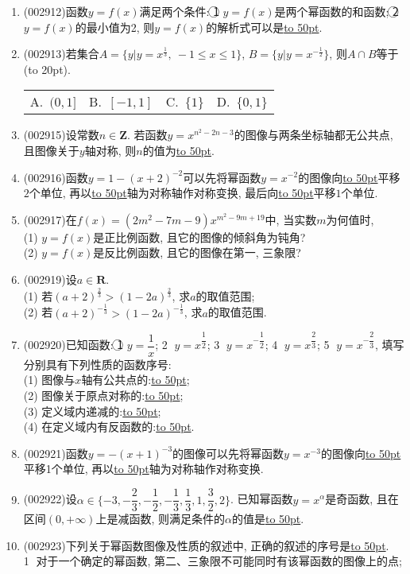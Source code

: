 \documentclass[10pt,a4paper]{article}
\newcommand{\blank}[1]{\underline{\hbox to #1pt{}}}
\newcommand{\bracket}[1]{(\hbox to #1pt{})}
\newcommand{\fourch}[4]{\par\begin{tabular}{p{.23\textwidth}p{.23\textwidth}p{.23\textwidth}p{.23\textwidth}}
A.~#1 &B.~#2& C.~#3& D.~#4
\end{tabular}}
\begin{document}
\begin{enumerate}[1.]
\item {\tiny (002912)}函数$y=f(x)$满足两个条件:
\textcircled{1} $y=f(x)$是两个幂函数的和函数; \textcircled{2} $y=f(x)$的最小值为2, 则$y=f(x)$的解析式可以是\blank{50}.
\item {\tiny (002913)}若集合$A=\{y|y={x^{\frac 13}}, \ -1\le x\le 1\}$, $B=\{y|y={x^{-\frac 12}}\}$, 则$A\cap B$等于\bracket{20}.
\fourch{$(0,1]$}{$[-1,1]$}{$\{1\}$}{$\{0,1\}$}
\item {\tiny (002915)}设常数$n\in \mathbf{Z}$. 若函数$y=x^{n^2-2n-3}$的图像与两条坐标轴都无公共点, 且图像关于$y$轴对称, 则$n$的值为\blank{50}.
\item {\tiny (002916)}函数$y=1-(x+2)^{-2}$可以先将幂函数$y=x^{-2}$的图像向\blank{50}平移$2$个单位, 再以\blank{50}轴为对称轴作对称变换, 最后向\blank{50}平移$1$个单位.
\item {\tiny (002917)}在$f(x)=(2m^2-7m-9)x^{m^2-9m+19}$中, 当实数$m$为何值时,\\
(1) $y=f(x)$是正比例函数, 且它的图像的倾斜角为钝角?\\
(2) $y=f(x)$是反比例函数, 且它的图像在第一, 三象限?
\item {\tiny (002919)}设$a\in \mathbf{R}$.\\
(1) 若$(a+2)^{\frac 23}>{(1-2a)}^{\frac 23}$, 求$a$的取值范围;\\
(2) 若$(a+2)^{-\frac 13}>(1-2a)^{-\frac 13}$, 求$a$的取值范围.
\item {\tiny (002920)}已知函数: \textcircled{1} $y=\dfrac 1x$; \textcircled{2} $y=x^{\dfrac 12}$; \textcircled{3} $y=x^{-\dfrac 12}$; \textcircled{4} $y={x^{\dfrac 23}}$; \textcircled{5} $y=x^{-\dfrac 23}$, 填写分别具有下列性质的函数序号:\\ 
(1) 图像与$x$轴有公共点的:\blank{50};\\
(2) 图像关于原点对称的:\blank{50};\\
(3) 定义域内递减的:\blank{50};\\
(4) 在定义域内有反函数的:\blank{50}.
\item {\tiny (002921)}函数$y=-(x+1)^{-3}$的图像可以先将幂函数$y=x^{-3}$的图像向\blank{50}平移1个单位, 再以\blank{50}轴为对称轴作对称变换.
\item {\tiny (002922)}设$\alpha \in \{-3,-\dfrac 23,-\dfrac 12,-\dfrac 13,\dfrac 13,1,\dfrac 32,2\}$. 已知幂函数$y=x^{\alpha}$是奇函数, 且在区间$(0,+\infty)$上是减函数, 则满足条件的$\alpha$的值是\blank{50}.
\item {\tiny (002923)}下列关于幂函数图像及性质的叙述中, 正确的叙述的序号是\blank{50}.\\
\textcircled{1} 对于一个确定的幂函数, 第二、三象限不可能同时有该幂函数的图像上的点;\\

\end{enumerate}
\end{document}
